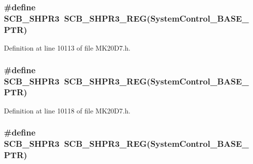 \subsubsection[{\texorpdfstring{S\+C\+B\+\_\+\+S\+H\+P\+R3}{SCB_SHPR3}}]{\setlength{\rightskip}{0pt plus 5cm}\#define S\+C\+B\+\_\+\+S\+H\+P\+R3~{\bf S\+C\+B\+\_\+\+S\+H\+P\+R3\+\_\+\+R\+EG}({\bf System\+Control\+\_\+\+B\+A\+S\+E\+\_\+\+P\+TR})}\hypertarget{group___s_c_b___register___accessor___macros_gac0a168427d861c6175c07a2da89bca40}{}\label{group___s_c_b___register___accessor___macros_gac0a168427d861c6175c07a2da89bca40}


Definition at line 10113 of file M\+K20\+D7.\+h.

\subsubsection[{\texorpdfstring{S\+C\+B\+\_\+\+S\+H\+P\+R3}{SCB_SHPR3}}]{\setlength{\rightskip}{0pt plus 5cm}\#define S\+C\+B\+\_\+\+S\+H\+P\+R3~{\bf S\+C\+B\+\_\+\+S\+H\+P\+R3\+\_\+\+R\+EG}({\bf System\+Control\+\_\+\+B\+A\+S\+E\+\_\+\+P\+TR})}\hypertarget{group___s_c_b___register___accessor___macros_gac0a168427d861c6175c07a2da89bca40}{}\label{group___s_c_b___register___accessor___macros_gac0a168427d861c6175c07a2da89bca40}


Definition at line 10118 of file M\+K20\+D7.\+h.

\subsubsection[{\texorpdfstring{S\+C\+B\+\_\+\+S\+H\+P\+R3}{SCB_SHPR3}}]{\setlength{\rightskip}{0pt plus 5cm}\#define S\+C\+B\+\_\+\+S\+H\+P\+R3~{\bf S\+C\+B\+\_\+\+S\+H\+P\+R3\+\_\+\+R\+EG}({\bf System\+Control\+\_\+\+B\+A\+S\+E\+\_\+\+P\+TR})}\hypertarget{group___s_c_b___register___accessor___macros_gac0a168427d861c6175c07a2da89bca40}{}\label{group___s_c_b___register___accessor___macros_gac0a168427d861c6175c07a2da89bca40}


